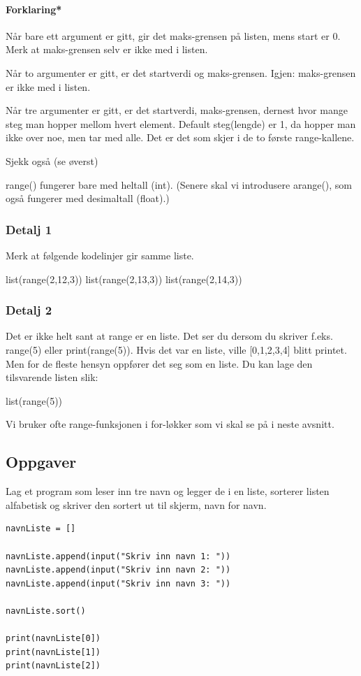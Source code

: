 \paragraph{Forklaring*} 
Når bare ett argument er gitt, gir det maks-grensen på listen, mens start er 0. Merk at maks-grensen selv er ikke med i listen.

Når to argumenter er gitt, er det startverdi og maks-grensen. Igjen: maks-grensen er ikke med i listen. 

Når tre argumenter er gitt, er det startverdi, maks-grensen, dernest hvor mange steg man hopper mellom hvert element. Default steg(lengde) er 1, da hopper man ikke over noe, men tar med alle. Det er det som skjer i de to første range-kallene. 

Sjekk også 
(se øverst) 

range() fungerer bare med heltall (int). (Senere skal vi introdusere arange(), som også fungerer med desimaltall (float).) 

\subsubsection{Detalj 1}
Merk at følgende kodelinjer gir samme liste.
\begin{usncodebox}
list(range(2,12,3))
list(range(2,13,3))
list(range(2,14,3))
\end{usncodebox}

\subsubsection{Detalj 2}
Det er ikke helt sant at range er en liste. Det ser du dersom du skriver f.eks. range(5) eller print(range(5)). Hvis det var en liste, ville [0,1,2,3,4] blitt printet. Men for de fleste hensyn oppfører det seg som en liste. Du kan lage den tilsvarende listen slik:
\begin{usncodebox}
list(range(5))
\end{usncodebox}

Vi bruker ofte range-funksjonen i for-løkker som vi skal se på i neste avsnitt. 

\subsection{Oppgaver}

\begin{exercise}
Lag et program som leser inn tre navn og legger de i en liste, sorterer listen alfabetisk og skriver den sortert ut til skjerm, navn for navn. 
\end{exercise}
\begin{solution}
\begin{lstlisting}
navnListe = []

navnListe.append(input("Skriv inn navn 1: "))
navnListe.append(input("Skriv inn navn 2: "))
navnListe.append(input("Skriv inn navn 3: "))

navnListe.sort()

print(navnListe[0])
print(navnListe[1])
print(navnListe[2])
\end{lstlisting}
\end{solution}

